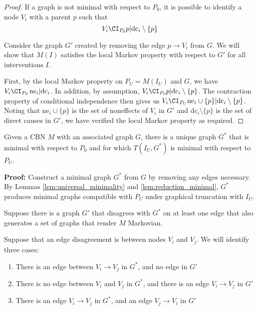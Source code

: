\begin{proof}
If a graph is not minimal with respect to $P_0$, it is possible to identify a node $V_i$ with a parent $p$ such that \[V_i\CI_{P_0} p|\mathrm{dc}_i\setminus \{p\}\]

Consider the graph $G'$ created by removing the edge $p\to V_i$ from $G$. We will show that $M(I)$ satisfies the local Markov property with respect to $G'$ for all interventions $I$.

First, by the local Markov property on $P_U=M(I_U)$ and $G$, we have $V_i \CI_{P_U} \mathrm{ne}_i|\mathrm{dc}_i$. In addition, by assumption, $V_i\CI_{P_0} p|\mathrm{dc}_i\setminus \{p\}$. The contraction property of conditional independence then gives us $V_i \CI_{P_U} \mathrm{ne}_i\cup\{p\}|\mathrm{dc}_i\setminus\{p\}$. Noting that $\mathrm{ne}_i\cup\{p\}$ is the set of noneffects of $V_i$ in $G'$ and $\mathrm{dc}_i\setminus \{p\}$ is the set of direct causes in $G'$, we have verified the local Markov property as required.
\end{proof}

\begin{theorem}\label{th:unique-minimal-graph}
Given a CBN $M$ with an associated graph $G$, there is a unique graph $G^*$ that is minimal with respect to $P_0$ and for which $T(I_U,G^*)$ is minimal with respect to $P_U$.
\end{theorem}

\textbf{Proof:} Construct a minimal graph $G^*$ from $G$ by removing any edges necessary. By Lemmas \ref{lem:universal_minimality} and \ref{lem:reduction_minimal}, $G^*$ produces minimal graphs compatible with $P_U$ under graphical truncation with $I_U$.

Suppose there is a graph $G'$ that disagrees with $G^*$ on at least one edge that also generates a set of graphs that render $M$ Markovian.

Suppose that an edge disagreement is between nodes $V_i$ and $V_j$. We will identify three cases:
\begin{enumerate}
    \item There is an edge between $V_i\to V_j$ in $G^*$, and no edge in $G'$
    \item There is no edge between $V_i$ and $V_j$ in $G^*$, and there is an edge $V_i\to V_j$ in $G'$
    \item There is an edge $V_i \to V_j$ in $G^*$, and an edge $V_j\to V_i$ in $G'$
\end{enumerate}

